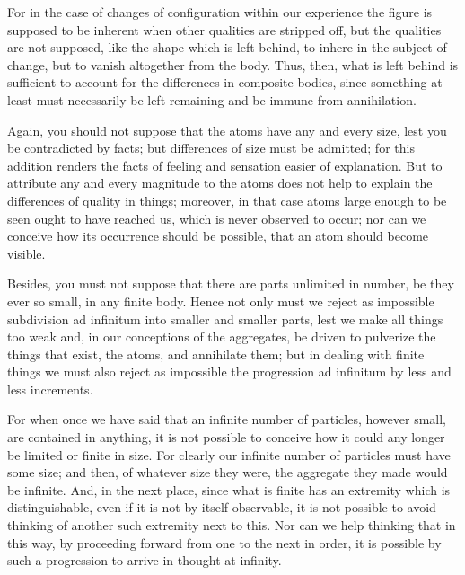 \documentclass{stex}
\begin{document}
For in the case of changes of configuration within our experience the figure is supposed to be inherent when other qualities are stripped off, but the qualities are not supposed, like the shape which is left behind, to inhere in the subject of change, but to vanish altogether from the body.
Thus, then, what is left behind is sufficient to account for the differences in composite bodies, since something at least must necessarily be left remaining and be immune from annihilation.

Again, you should not suppose that the atoms have any and every size, lest you be contradicted by facts; but differences of size must be admitted; for this addition renders the facts of feeling and sensation easier of explanation.
But to attribute any and every magnitude to the atoms does not help to explain the differences of quality in things; moreover, in that case atoms large enough to be seen ought to have reached us, which is never observed to occur; nor can we conceive how its occurrence should be possible, \idEst{} that an atom should become visible.

Besides, you must not suppose that there are parts unlimited in number, be they ever so small, in any finite body.
Hence not only must we reject as impossible subdivision \foreignlanguage{latin}{ad infinitum} into smaller and smaller parts, lest we make all things too weak and, in our conceptions of the aggregates, be driven to pulverize the things that exist, \idEst{} the atoms, and annihilate them; but in dealing with finite things we must also reject as impossible the progression \foreignlanguage{latin}{ad infinitum} by less and less increments.

For when once we have said that an infinite number of particles, however small, are contained in anything, it is not possible to conceive how it could any longer be limited or finite in size.
For clearly our infinite number of particles must have some size; and then, of whatever size they were, the aggregate they made would be infinite.
And, in the next place, since what is finite has an extremity which is distinguishable, even if it is not by itself observable, it is not possible to avoid thinking of another such extremity next to this.
Nor can we help thinking that in this way, by proceeding forward from one to the next in order, it is possible by such a progression to arrive in thought at infinity.
\end{document}
